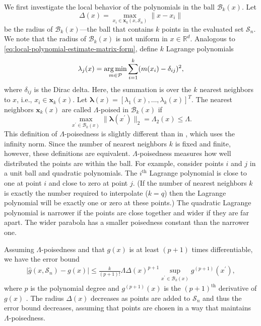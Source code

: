 We first investigate the local behavior of the polynomials in the ball $\mathcal{B}_k(x)$. Let 
\begin{equation*}
\Delta(x) = \max_{x_i \in\boldsymbol{x}_k(x,\mathcal{S}_n)}{\|x-x_i\|}
\end{equation*}
be the radius of $\mathcal{B}_k(x)$---the ball that contains $k$ points in the evaluated set $\mathcal{S}_n$. We note that the radius of $\mathcal{B}_k(x)$ is not uniform in $x \in \mathbb{R}^{d}$. Analogous to \eqref{eq:local-polynomial-estimate-matrix-form}, define $k$ Lagrange polynomials
\begin{equation}
    \lambda_j(x) = \operatorname*{arg\,min}_{m \in \mathcal{P}}{\sum_{i=1}^{k} (m(x_i)-\delta_{ij})^2},
\end{equation}
where $\delta_{ij}$ is the Dirac delta. Here, the summation is over the $k$ nearest neighbors to $x$, i.e., $x_i \in \boldsymbol{x}_k(x)$. Let $\boldsymbol{\lambda}(x) = [\lambda_1(x), \hdots, \lambda_k(x)]^T$. The nearest neighbors $\boldsymbol{x}_k(x)$ are called $\Lambda$-poised in $\mathcal{B}_k(x)$ if
\begin{equation}
    \max_{x^{\prime} \in \mathcal{B}_k(x)}{\|\boldsymbol{\lambda}(x^{\prime})\|_2} = \Lambda_2(x) \leq \Lambda.
    \label{eq:poisedness}
\end{equation}
This definition of $\Lambda$-poisedness is slightly different than in \citet{Connetal2009}, which uses the infinity norm. Since the number of nearest neighbors $k$ is fixed and finite, however, 
these definitions are equivalent. $\Lambda$-poisedness measures how well distributed the points are within the ball. For example, consider points $i$ and $j$ in a unit ball and quadratic polynomials. The $i^{\text{th}}$ Lagrange polynomial is close to one at point $i$ and close to zero at point $j$. (If the number of nearest neighbors $k$ is exactly the number required to interpolate ($k=q$) then the Lagrange polynomial will be exactly one or zero at these points.) 
%
The quadratic Lagrange polynomial is narrower if the points are close together and wider if they are far apart. The wider parabola has a smaller poisedness constant than the narrower one. 

 Assuming $\Lambda$-poisedness and that $g(x)$ is at least $(p+1)$ times differentiable, we have the error bound
\begin{align}
    \vert \hat{g}(x, \mathcal{S}_n) - g(x) \vert \leq \frac{k}{(p+1)!} \Lambda \Delta(x)^{p+1} \sup_{x^{\prime} \in \mathcal{B}_k(x)}{g^{(p+1)}(x^{\prime})},
    \label{eq:local-error-bound}
\end{align}
where $p$ is the polynomial degree and $g^{(p+1)}(x)$ is the $(p+1)^{\text{th}}$ derivative of $g(x)$ \citep{Connetal2009}. The radius $\Delta(x)$ decreases as points are added to $\mathcal{S}_n$ and thus the error bound decreases, assuming that points are chosen in a way that maintains $\Lambda$-poisedness.

